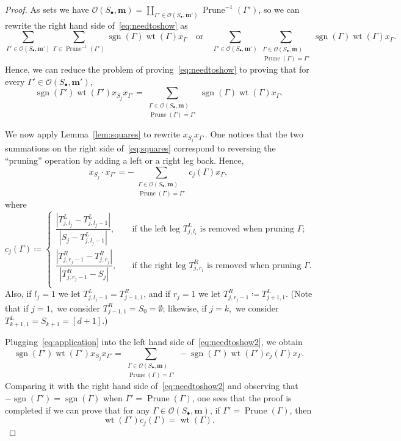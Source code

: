\documentclass[ALCO,ThmDefs,Unicode,epreuves]{cedram}
\newcommand{\bm}[1]{{\boldsymbol{#1}}}
\newcommand\m{\bm{m}}
\DeclareMathOperator{\wt}{wt}
\DeclareMathOperator{\prune}{Prune}
\DeclareMathOperator{\sgn}{sgn}
\newcommand{\D}{{\Gamma}}
\newcommand{\lspd}{\mathcal O}
\begin{document}
\begin{proof}
	As sets we have $\lspd(S_\bullet,\m)=\coprod_{\D'\in \lspd(S_\bullet,\m')} \prune^{-1}(\D')$, %
	so we can rewrite the right hand side of~\eqref{eq:needtoshow} as
	\[ \sum_{\D'\in\lspd(S_\bullet,\m')}\sum_{\D\in\prune^{-1}(\D')}\sgn(\D)\wt(\D)x_\D \quad \text{or} \quad \sum_{\D'\in\lspd(S_\bullet,\m')} \sum_{\substack{\D\in\lspd(S_\bullet,\m)\\ \prune(\D)=\D'}} \sgn(\D)\wt(\D)x_\D.\]
	Hence, we can reduce the problem of proving~\eqref{eq:needtoshow} to proving that for every $\D' \in \lspd(S_\bullet, \m'),$ 
	\begin{equation}\label{eq:needtoshow2}
	\sgn(\D')\wt(\D')x_{S_j}x_{\D'} = \sum_{\substack{\D\in\lspd(S_\bullet,\m)\\ \prune(\D)=\D'}} \sgn(\D)\wt(\D)x_\D.
	\end{equation}
	
	We now apply Lemma~\ref{lem:squares} to rewrite $x_{S_j} x_{\D'}$. One notices that the two summations on the right side of~\eqref{eq:squares} correspond to reversing the ``pruning'' operation by adding a left or a right leg back. Hence,
	\begin{equation}\label{eq:application}
	x_{S_j}\cdot x_{\D'} = -\sum_{\substack{\D\in\lspd(S_\bullet,\m)\\ \prune(\D)=\D'}} c_j(\D) x_\D,
	\end{equation}
	where %
	\[ c_j(\D) \coloneqq \begin{cases}
	\dfrac{|T^L_{j,l_j}-T^L_{j,l_j-1}|}{|S_j-T^L_{j,l_j-1}|}, & \quad 
	\text{if the left leg $T^L_{j,l_i}$ is removed when pruning $\D$;} \\
	\dfrac{|T^R_{j,r_j-1}-T^R_{j,r_j}|}{|T^R_{j,r_j-1}-S_j|}, & \quad 
	\text{if the right leg $T^R_{j,r_i}$ is removed when pruning $\D$.} \\
	\end{cases}
	\]
	Also, if $l_j=1$ we let $T^L_{j, l_j-1} = T^R_{j-1, 1}$, and if $r_j=1$ we let $T^R_{j, r_j-1} \coloneqq T^L_{j+1,1}.$ (Note that if $j=1,$ we consider $T^R_{j-1,1} = S_0 = \emptyset$; likewise, if $j=k,$ we consider $T^L_{k+1,1} = S_{k+1} = [d+1].$) 
	
	Plugging~\eqref{eq:application} into the left hand side of~\eqref{eq:needtoshow2}, we obtain
	\begin{equation}\label{eq:application2}
	\sgn(\D')\wt(\D')x_{S_j}x_{\D'} = \sum_{\substack{\D\in\lspd(S_\bullet,\m)\\ \prune(\D)=\D'}} - \sgn(\D')\wt(\D')c_j(\D) x_\D.
	\end{equation}
	Comparing it with the right hand side of~\eqref{eq:needtoshow2} and observing that $-\sgn(\D')=\sgn(\D)$ when $\D' =\prune(\D)$, one sees that the proof is completed if we can prove that for any $\D \in \lspd(S_\bullet,\m)$, if $\D'=\prune(\D)$, then
	\begin{equation}\label{eq:comparison2}
	\wt(\D')c_j(\D)=\wt(\D).
	\end{equation}
	

\end{proof}
\end{document}

